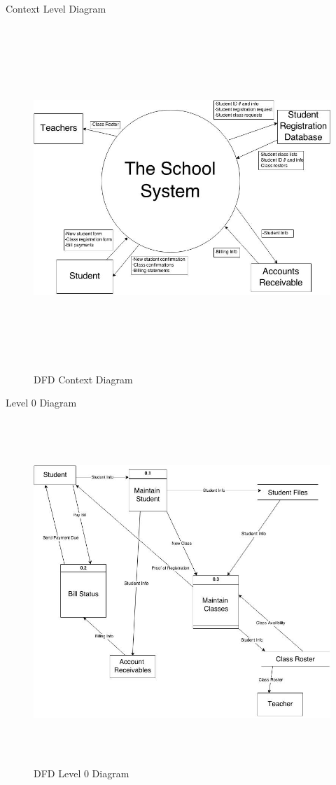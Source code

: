\documentclass{article}
\begin{document}
\begin{section}{Context Level Diagram}
    \begin{figure}[h!]
        \begin{center}
           \centerline{ \includegraphics[height=13cm]{DF.jpg}}
            \caption{DFD Context Diagram}
        \end{center}
    \end{figure}
\end{section}
\newpage
\begin{section}{Level 0 Diagram}
    \begin{figure}[h!]
        \begin{center}
            \centerline{\includegraphics[height=13cm]{DFD.jpg}}
            \caption{DFD Level 0 Diagram}
        \end{center}
    \end{figure}
\end{section}
\end{document}
